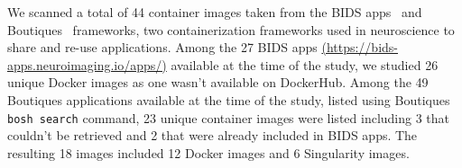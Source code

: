 \documentclass[a4paper,num-refs]{oup-contemporary}
\begin{document}
We scanned a total of 44 container images taken from the BIDS
apps~\cite{gorgolewski2017bids} and Boutiques~\cite{glatard2018boutiques}
frameworks, two containerization frameworks used in neuroscience to share
and re-use applications. Among the 27 BIDS apps \href{https://bids-apps.neuroimaging.io/apps/}
{(https://bids-apps.neuroimaging.io/apps/)} available at the time of
the study, we studied 26
unique Docker images as one wasn't available on DockerHub. Among the 49
Boutiques applications available at the time of the study, listed using
Boutiques \texttt{bosh search} command, 23 unique container images were
listed including 3 that couldn't be retrieved and 2 that were already
included in BIDS apps. The resulting 18 images included 12 Docker images
and 6 Singularity images.
\end{document}
